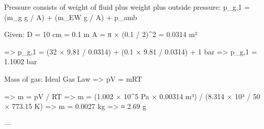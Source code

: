 Pressure consists of weight of fluid plus weight plus outside pressure:  
p_g,1 = (m_g g / A) + (m_EW g / A) + p_amb  

Given:  
D = 10 cm = 0.1 m  
A = π × (0.1 / 2)^2 = 0.0314 m²  

=> p_g,1 = (32 × 9.81 / 0.0314) + (0.1 × 9.81 / 0.0314) + 1 bar  
=> p_g,1 = 1.1002 bar  

Mass of gas: Ideal Gas Law => pV = mRT  

=> m = pV / RT  
=> m = (1.002 × 10^5 Pa × 0.00314 m³) / (8.314 × 10³ / 50 × 773.15 K)  
=> m = 0.0027 kg => ≈ 2.69 g  

---